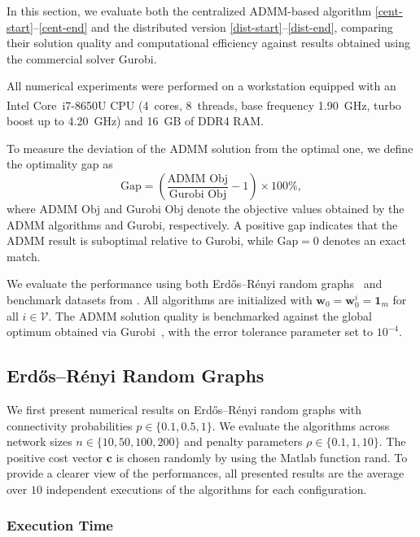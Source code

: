 \documentclass[11pt,a4paper]{article}
\theoremstyle{plain}
\theoremstyle{definition}
\theoremstyle{remark}
\begin{document}
	In this section, we evaluate both the centralized ADMM-based algorithm \eqref{cent-start}--\eqref{cent-end} and the distributed version \eqref{dist-start}--\eqref{dist-end}, comparing their solution quality and computational efficiency against results obtained using the commercial solver \textsf{Gurobi}.
	
	All numerical experiments were performed on a workstation equipped with an Intel\textsuperscript{\textregistered} Core\texttrademark~i7-8650U CPU (4~cores, 8~threads, base frequency 1.90\, GHz, turbo boost up to 4.20\, GHz) and 16\, GB of DDR4 RAM.
	
	To measure the deviation of the ADMM solution from the optimal one, we define the optimality gap as
	\begin{equation}
		\textrm{Gap} = \left( \frac{\textrm{ADMM Obj}}{\textrm{Gurobi Obj}} - 1 \right) \times 100\%,
		\label{gap}
	\end{equation}
	where \(\textrm{ADMM Obj}\) and \(\textrm{Gurobi Obj}\) denote the objective values obtained by the ADMM algorithms and \textsf{Gurobi}, respectively. A positive gap indicates that the ADMM result is suboptimal relative to \textsf{Gurobi}, while \(\textrm{Gap} = 0\) denotes an exact match.
	
	We evaluate the performance using both Erdős–Rényi random graphs~\cite{erdos1959erdos} and benchmark datasets from \cite{carvalho2023data}. All algorithms are initialized with $\boldsymbol{w}_0 = \boldsymbol{w}^i_0 = \mathbf{1}_m$ for all $i \in \mathcal{V}$. The ADMM solution quality is benchmarked against the global optimum obtained via \textsf{Gurobi}~\cite{gurobi}, with the error tolerance parameter set to $10^{-4}$.
	
	
	\subsection{Erd\H{o}s--R\'enyi Random Graphs}\label{Erdos}
	We first present numerical results on Erd\H{o}s--R\'enyi random graphs \cite{erdos1959erdos} with connectivity probabilities $p \in \{0.1, 0.5, 1\}$. We evaluate the algorithms across network sizes $n \in \{10, 50, 100, 200\}$ and penalty parameters $\rho \in \{0.1, 1, 10\}$. The positive cost vector $\boldsymbol{c}$ is chosen randomly by using the Matlab function \textsf{rand}. To provide a clearer view of the performances, all presented results are the average over $10$ independent executions of the algorithms for each configuration.
	\subsubsection*{Execution Time}
	
\end{document}
